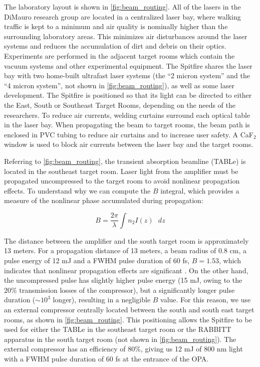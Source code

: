 The laboratory layout is shown in \cref{fig:beam_routing}. All of the lasers in the DiMauro research group are located in a centralized laser bay, where walking traffic is kept to a minimum and air quality is nominally higher than the surrounding laboratory areas. This minimizes air disturbances around the laser systems and reduces the accumulation of dirt and debris on their optics. Experiments are performed in the adjacent target rooms which contain the vacuum systems and other experimental equipment. The Spitfire shares the laser bay with two home-built ultrafast laser systems (the ``2 micron system'' and the ``4 micron system'', not shown in \cref{fig:beam_routing}), as well as some laser development. The Spitfire is positioned so that its light can be directed to either the East, South or Southeast Target Rooms, depending on the needs of the researchers. To reduce air currents, welding curtains surround each optical table in the laser bay. When propagating the beam to target rooms, the beam path is enclosed in PVC tubing to reduce air curtains and to increase user safety. A CaF$_2$ window is used to block air currents between the laser bay and the target rooms.

Referring to \cref{fig:beam_routing}, the transient absorption beamline (TABLe) is located in the southeast target room. Laser light from the amplifier must be propagated uncompressed to the target room to avoid nonlinear propagation effects. To understand why we can compute the $B$ integral, which provides a measure of the nonlinear phase accumulated during propagation: 

\begin{equation}
B = \frac{2 \pi}{\lambda} \int n_2 I(z) \text{ } dz
\label{eqn:B-integral}
\end{equation}

The distance between the amplifier and the south target room is approximately 13 meters. For a propagation distance of 13 meters, a beam radius of 0.8 cm, a pulse energy of 12 mJ and a FWHM pulse duration of 60 fs, $B = 1.53$, which indicates that nonlinear propagation effects are significant \cite{zahedpourMeasurementNonlinearRefractive2015}. On the other hand, the uncompressed pulse has slightly higher pulse energy (15 mJ, owing to the 20\% transmission losses of the compressor), but a significantly longer pulse duration ($\sim 10^3$ longer), resulting in a negligible $B$ value. For this reason, we use an external compressor centrally located between the south and south east target rooms, as shown in \cref{fig:beam_routing}. This positioning allows the Spitfire to be used for either the TABLe in the southeast target room or the RABBITT apparatus \cite{chirlaAttosecondPulseGeneration2011,gormanAttosecondProbingElectron2018,kiesewetterDynamicsNearThresholdAttosecond2019} in the south target room (not shown in \cref{fig:beam_routing}). The external compressor has an efficiency of 80\%, giving us 12 mJ of 800 nm light with a FWHM pulse duration of 60 fs at the entrance of the OPA.

